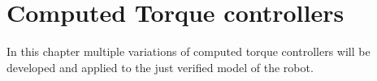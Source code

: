 \chapter{ Computed Torque controllers}

In this chapter multiple variations of computed torque controllers will be developed and applied to the just verified model of the robot. 